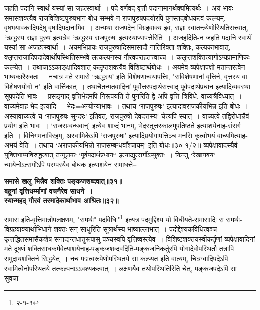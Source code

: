 {{{{ जहति पदानि स्वार्थं यस्यां सा जहत्स्वार्था~।
पदे वर्णवद् वृत्तौ पदानामानर्थक्यमित्यर्थः~।
अयं भावः- समासशक्त्यैव राजविशिष्टपुरुषभान {बोध} सम्भवे न राजपुरुषपदयोरपि पुनस्तद्बोधकत्वं कल्प्यम्, वृषभयावकादिपदेषु वृषादिपदानामिव~।
 अन्यथा राजपदेन विग्रहवाक्य इव, राज्ञः स्वातन्त्र्येणोस्थितिसत्त्वात्, `ऋद्धस्य राज्ञः पुरुष इत्यत्रेव `ऋद्धस्य राजपुरुषः इत्यस्याप्यापत्तेरिति~।
 अजहदिति-न जहति पदानि स्वार्थं यस्यां सा अजहत्स्वार्था~।
 अयमभिप्रायः-राजपुरुषादिसमासादौ नातिरिक्ता शक्तिः, कल्पकाभावात्, क्लृप्तराजादिपदादेवार्थोपस्थितिसम्भवे लत्कल्पनस्य गौरवपराहतत्त्वाच्च~।
कलॄप्तशक्तित्यागोऽप्यप्रामाणिकः कल्प्येत~।
तथाचाऽऽकाङ्क्षादिवशात् कलॄप्तशक्त्यैव विशिष्टार्थबोधः~।
 अयमेव व्यपेक्षापक्षो मतान्तरत्वेन भाष्यकारैरुक्तः~।
 नचात्र मते समासे `ऋद्धस्य' इति विशेषणान्वयापत्तिः, "सविशेषणानां वृत्तिर्न, वृत्तस्य वा विशेषणयोगो न" इति वार्त्तिकात्~।
तथाचैतन्मतवादिनां पूर्वोत्तरपदार्थसत्त्वाद् पूर्वपदार्थप्रधान इत्यादिव्यवस्था सूपपदेति भावः~।
 प्रसङ्गाद् वृत्तिभेदमपि निरूपयति-ते पुनरिति-द्वे अपि वृत्ति त्रिविधे, वाच्यत्रैविध्यात्~।
वाच्यमेवाह-भेद इत्यादि~।
भेदः=अन्योन्याभावः~।
तथाच `राजपुरुषः' इत्यादावराजकीयभिन्न इति बोधः~।
अस्यावाच्यत्वे च `राजपुरुषः सुन्दरः' इतिवत्, राजपुरुषो देवदत्तस्य' चेत्यपि स्यात्~।
वाच्यत्वे तद्विरोधान्नैवं प्रयोग इति भावः~।
 `राजसम्बन्धवान्' इत्येव शाब्दं भानम्, भेदस्तूत्तरकालमुपतिष्ठते इत्याशयेनाह-संसर्ग इति~।
विनिगमनाविरहम्, अस्वामिकेऽपि `राजपुरुषः' इत्यादिप्रयोगापत्तिञ्च मनसि कृत्वोभयं वाच्यमित्याह-अभयं वेति~।
तथाच `अराजकीयभिन्नो राजसम्बन्धवाँश्चायम्' इति बोधः॥३० १/२॥
 व्यपेक्षावादस्यैवं युक्तिभाष्यविरुद्धत्वात् तन्मूलकः `पूर्वपदार्थप्रधानः' इत्याद्युत्सर्गोऽप्युक्तः~।
किन्तु `रेखागवय' न्यायेनोऽत्सर्गोऽपि परम्परयैव बोधक इत्याशयेन समाधत्ते--
\begin{center}{\bfseries समासे खलु भिन्नैव शक्तिः पङ्कजशब्दवात्॥३१॥\\[10pt]
 बहूनां वृत्तिधर्म्माणां वचनैरेव साधने~।\\
 स्यान्महद् गौरवं तस्मादेकार्थाभाव आश्रितः॥३२॥}\end{center}
 समास इति-वृत्तिमात्रोपलक्षणम्, "समर्थः" पदविधिः"\footnote{२-१-१} इत्यत्र पदमुद्दिश्य यो विधीयते-समासादिः स समर्थः-विग्रहवाक्यार्थाभिधाने शक्तः सन् साधुरिति सूत्रार्थस्य भाष्याल्लाभात्~।
 पदोद्देश्यकविधित्वञ्च-कृत्तद्धितसमासैकशेष सनाद्यन्तधातुरूपासु पञ्चस्वपि वृत्तिष्वस्त्येव~।
विशिष्टशक्तयस्वीकर्तॄणां व्यपेक्षावादिनां मते दूषणं शक्तिसाधकमेवेत्याशयेनाह-पङ्कजशब्दवदिति-पङ्कजनिकर्तुरपि योगादेवोपस्थितौ तत्रापि समुदायशक्तिर्न सिद्धयेत्~। 
 नच पद्मत्वरूपेणोपस्थितये सा कल्प्यत इति वात्यम्, चित्रग्वादिपदेऽपि स्वामित्वेनोपस्थितये तत्कल्पनाऽऽवश्यकत्वात्~।
लक्षणयैव तथोपस्थितिरिति चेत्, पङ्कजपदेऽपि सा सुवचा~।
}}}}
